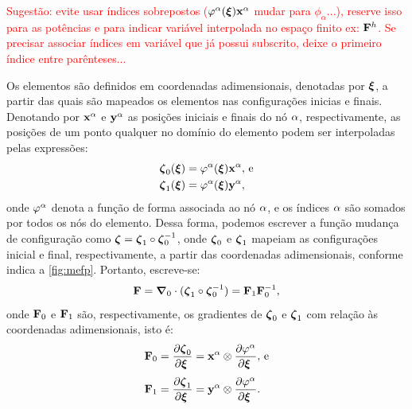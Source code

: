 \documentclass[Tese.tex]{subfiles}
\begin{document}
\textcolor{red}{Sugestão: evite usar índices sobrepostos ($\varphi^\alpha(\boldsymbol{\xi})\mathbf{x}^\alpha$ mudar para $\phi_{\alpha}$...), reserve isso para as potências e para indicar variável interpolada no espaço finito ex: $\mathbf{F}^h$. Se precisar associar índices em variável que já possui subscrito, deixe o primeiro índice entre parênteses...}

Os elementos são definidos em coordenadas adimensionais, denotadas por $\boldsymbol{\xi}$, a partir das quais são mapeados os elementos nas configurações inicias e finais. Denotando por $\mathbf{x}^\alpha$ e $\mathbf{y}^\alpha$ as posições iniciais e finais do nó $\alpha$, respectivamente, as posições de um ponto qualquer no domínio do elemento podem ser interpoladas pelas expressões:
\begin{align}
&\boldsymbol{\zeta}_0(\boldsymbol{\xi}) = \varphi^\alpha(\boldsymbol{\xi})\mathbf{x}^\alpha, \text{\,e}\\
&\boldsymbol{\zeta}_1(\boldsymbol{\xi}) = \varphi^\alpha(\boldsymbol{\xi})\mathbf{y}^\alpha,
\end{align}
onde $\varphi^\alpha$ denota a função de forma associada ao nó $\alpha$, e os índices $\alpha$ são somados por todos os nós do elemento. Dessa forma, podemos escrever a função mudança de configuração como $\boldsymbol{\zeta} = \boldsymbol{\zeta}_1\circ\boldsymbol{\zeta}_0^{-1}$, onde $\boldsymbol{\zeta}_0$ e  $\boldsymbol{\zeta}_1$ mapeiam as configurações inicial e final, respectivamente, a partir das coordenadas adimensionais, conforme indica a \autoref{fig:mefp}. Portanto, escreve-se:
\begin{equation}\label{eq:F-FEM}
\mathbf{F} = \boldsymbol{\nabla}_0\cdot(\boldsymbol{\zeta}_1\circ\boldsymbol{\zeta}_0^{-1}) = \mathbf{F}_1\mathbf{F}_0^{-1},
\end{equation}
onde $\mathbf{F}_0$ e $\mathbf{F}_1$ são, respectivamente, os gradientes de $\boldsymbol{\zeta}_0$ e $\boldsymbol{\zeta}_1$ com relação às coordenadas adimensionais, isto é:
\begin{align}
&\mathbf{F}_0 = \dfrac{\partial\boldsymbol{\zeta}_0}{\partial\boldsymbol{\xi}_{\;}} = \mathbf{x}^\alpha\otimes\dfrac{\partial\varphi^\alpha}{\partial\boldsymbol{\xi}_{\;}}, \text{\,e} \label{eq:F0}\\[0.1cm]
&\mathbf{F}_1 = \dfrac{\partial\boldsymbol{\zeta}_1}{\partial\boldsymbol{\xi}_{\;}} = \mathbf{y}^\alpha\otimes\dfrac{\partial\varphi^\alpha}{\partial\boldsymbol{\xi}_{\;}}. \label{eq:F1}
\end{align}
\end{document}

